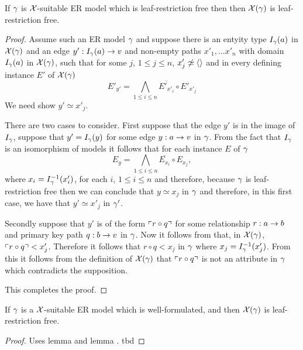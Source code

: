 \begin{lemma}
If $\gamma$ is $\mathcal{X}$-suitable ER model which is leaf-restriction free then
then $\mathcal{X}(\gamma)$ is leaf-restriction free.
\end{lemma}
\begin{proof}
Assume such an ER model $\gamma$ and suppose there is an entyity type $I_\gamma(a)$ in $\mathcal{X}(\gamma)$ and an edge $y': I_\gamma(a) \rightarrow v$ and non-empty paths $x'_1,...x'_n$   with domain $I_\gamma(a)$ in $\mathcal{X}(\gamma)$,  such that for some $j$, $1 \leq j \leq n$, $x'_j \not\simeq \langle\rangle$ and in every defining instance $E'$ of $\mathcal{X}(\gamma)$  
\begin{equation}
\label{restrictioninchimodel}
E'_{y'} = \bigwedge_{1 \leq i \leq n}{\overline{E'_{x'_i}}} \circ E'_{x'_j}
\end{equation}
We need show  $y' \simeq x'_j$.

There are two cases to consider. First suppose that the edge $y'$ is in the image of $I_\gamma$, suppose that $y'=I_\gamma(y)$ for some edge
$y:a \rightarrow v$ in $\gamma$. From the fact that $I_\gamma$ is an isomorphism of models it follows that for each instance $E$ of  $\gamma$
$$E_{y} = \bigwedge_{1 \leq i \leq n}{\overline{E_{x_i}}} \circ E_{x_j},$$
where $x_i=I^{-1}_\gamma(x'_i)$, for each $i$, $1 \leq i \leq n$ and therefore, because $\gamma$ is leaf-restriction free then we can conclude that
$y \simeq x_j$ in $\gamma$ and therefore, in this first case, we have that $y' \simeq x'_j$ in $\gamma'$.


Secondly suppose that $y'$ is of the form $\left\ulcorner r \circ q\right\urcorner$ for some relationship $r: a \rightarrow b$ and primary key path $q :b \rightarrow v$ in $\gamma$.
Now it follows from  that, in $\mathcal{X}(\gamma)$, $\left\ulcorner r \circ q\right\urcorner < x'_j$. Therefore  
it follows that $r \circ q < x_j$ in $\gamma$  where $x_j= I^{-1}_\gamma(x'_j)$. From this it follows from the definition of $\mathcal{X}(\gamma)$ that
 $\left\ulcorner r \circ q\right\urcorner$ is not an attribute in $\gamma$ which contradicts the supposition. 

This completes the proof.
\end{proof}

\begin{lemma}
If $\gamma$ is a $\mathcal{X}$-suitable ER model which is well-formulated,  and   then $\mathcal{X}(\gamma)$ is leaf-restriction free.
\end{lemma}
\begin{proof}
Uses lemma   and lemma . 
\vspace{0.5cm}
tbd
\end{proof}

